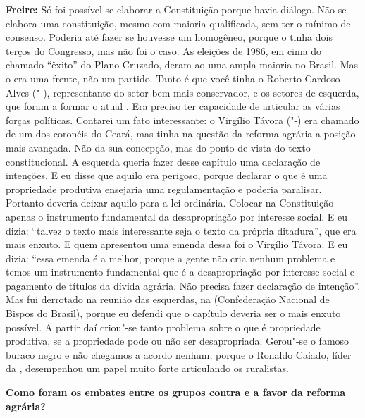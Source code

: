 \textbf{Freire:} Só foi possível se elaborar a Constituição porque havia
diálogo. Não se elabora uma constituição, mesmo com maioria qualificada,
sem ter o mínimo de consenso. Poderia até fazer se houvesse um 
homogêneo, porque o  tinha dois terços do Congresso, mas não foi o
caso. As eleições de 1986, em cima do chamado ``êxito'' do Plano
Cruzado, deram ao  uma ampla maioria no Brasil. Mas o  era uma
frente, não um partido. Tanto é que você tinha o Roberto Cardoso Alves
("-), representante do setor bem mais conservador, e os setores de
esquerda, que foram a formar o atual . Era preciso ter capacidade de
articular as várias forças políticas. Contarei um fato interessante: o
Virgílio Távora ("-) era chamado de um dos coronéis do Ceará, mas
tinha na questão da reforma agrária a posição mais avançada. Não da sua
concepção, mas do ponto de vista do texto constitucional. A esquerda
queria fazer desse capítulo uma declaração de intenções. E eu disse que
aquilo era perigoso, porque declarar o que é uma propriedade produtiva
ensejaria uma regulamentação e poderia paralisar. Portanto deveria
deixar aquilo para a lei ordinária. Colocar na Constituição apenas o
instrumento fundamental da desapropriação por interesse social. E eu
dizia: ``talvez o texto mais interessante seja o texto da própria
ditadura'', que era mais enxuto. E quem apresentou uma emenda dessa foi
o Virgílio Távora. E eu dizia: ``essa emenda é a melhor, porque a gente
não cria nenhum problema e temos um instrumento fundamental que é a
desapropriação por interesse social e pagamento de títulos da dívida
agrária. Não precisa fazer declaração de intenção''. Mas fui derrotado
na reunião das esquerdas, na  (Confederação Nacional de Bispos do
Brasil), porque eu defendi que o capítulo deveria ser o mais enxuto
possível. A partir daí criou"-se tanto problema sobre o que é propriedade
produtiva, se a propriedade pode ou não ser desapropriada. Gerou"-se o
famoso buraco negro e não chegamos a acordo nenhum, porque o Ronaldo
Caiado, líder da , desempenhou um papel muito forte articulando os
ruralistas.

\textbf{Como foram os embates entre os grupos contra e a favor da
reforma agrária?}

